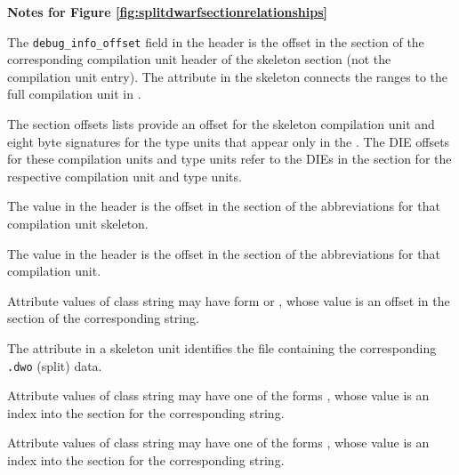 \clearpage
\begin{center}
   \textbf{Notes for Figure \ref{fig:splitdwarfsectionrelationships}}
\end{center}
\begin{description}

The \texttt{debug\_info\_offset} field in the header is the 
offset in the \dotdebuginfo{} section of the corresponding 
compilation unit header of the skeleton \dotdebuginfo{} section 
(not the compilation unit entry).  The \DWATdwoname{} attribute 
in the \dotdebuginfo{} skeleton connects 
the ranges to the full compilation unit in \dotdebuginfodwo.

The \dotdebugnames{} section  offsets lists provide an offset
for the skeleton compilation unit and eight 
byte signatures for the type units that appear only in the 
\dotdebuginfodwo. The DIE offsets for these 
compilation units and type units refer to the DIEs in the 
\dotdebuginfodwo{} section for the respective 
compilation unit and type units.

The \HFNdebugabbrevoffset{} value in the header is 
the offset in the \dotdebugabbrev{} section of the 
abbreviations for that compilation unit skeleton.

The \HFNdebugabbrevoffset{} value in the header 
is the offset in the \dotdebugabbrevdwo{} section of the 
abbreviations for that compilation unit.

Attribute values of class string may have form \DWFORMstrp{}
\bb 
or \DWFORMstrpeight{},
\eb
whose value is an offset in the 
\dotdebugstr{} section of the corresponding string.

The \DWATdwoname{}
attribute in a skeleton unit identifies the file containing 
the corresponding \texttt{.dwo} (split) data. 

%

Attribute values of class string may have one of the forms
\DWFORMstrxXNor, whose value is an index into the 
\dotdebugstroffsets{} section for the corresponding string.

Attribute values of class string may have one of the forms
\DWFORMstrxXNor, whose value is an index into the 
\dotdebugstroffsetsdwo{} section for the corresponding string.


\end{description}
